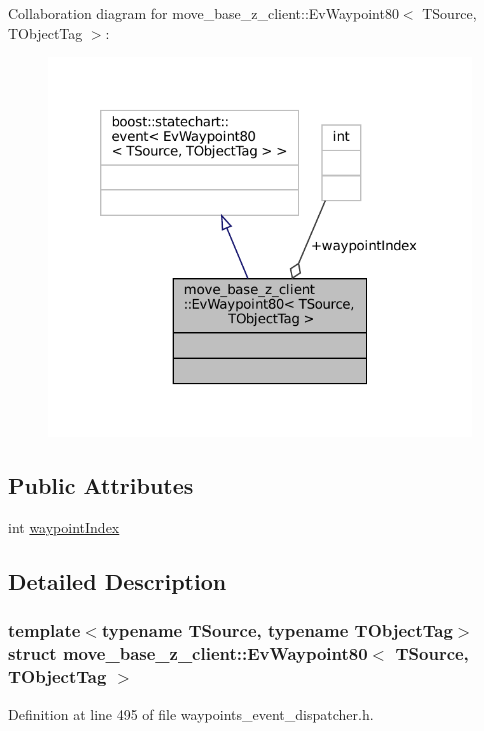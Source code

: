 Collaboration diagram for move\+\_\+base\+\_\+z\+\_\+client\+:\+:Ev\+Waypoint80$<$ T\+Source, T\+Object\+Tag $>$\+:
\nopagebreak
\begin{figure}[H]
\begin{center}
\leavevmode
\includegraphics[width=320pt]{structmove__base__z__client_1_1EvWaypoint80__coll__graph}
\end{center}
\end{figure}
\subsection*{Public Attributes}
\begin{DoxyCompactItemize}
\item 
int \hyperlink{structmove__base__z__client_1_1EvWaypoint80_aa622968a7a25b69aaba51eaab7d9e553}{waypoint\+Index}
\end{DoxyCompactItemize}


\subsection{Detailed Description}
\subsubsection*{template$<$typename T\+Source, typename T\+Object\+Tag$>$\newline
struct move\+\_\+base\+\_\+z\+\_\+client\+::\+Ev\+Waypoint80$<$ T\+Source, T\+Object\+Tag $>$}



Definition at line 495 of file waypoints\+\_\+event\+\_\+dispatcher.\+h.



